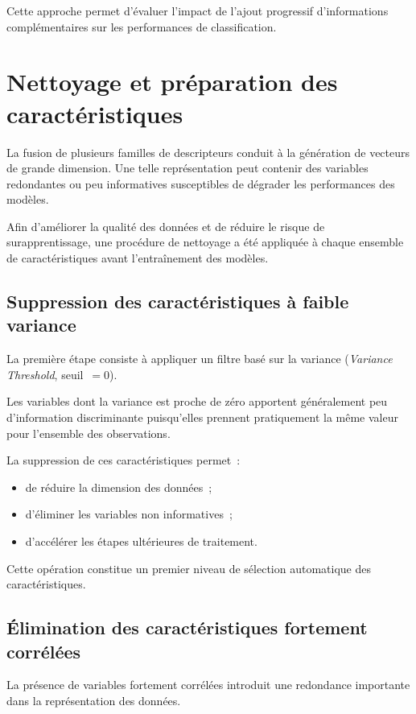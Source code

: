 Cette approche permet d'évaluer l'impact de l'ajout progressif d'informations complémentaires
sur les performances de classification.

\section{Nettoyage et préparation des caractéristiques}

La fusion de plusieurs familles de descripteurs conduit à la génération de vecteurs de grande
dimension. Une telle représentation peut contenir des variables redondantes ou peu
informatives susceptibles de dégrader les performances des modèles.

Afin d'améliorer la qualité des données et de réduire le risque de surapprentissage, une
procédure de nettoyage a été appliquée à chaque ensemble de caractéristiques avant
l'entraînement des modèles.

\subsection{Suppression des caractéristiques à faible variance}

La première étape consiste à appliquer un filtre basé sur la variance
(\emph{Variance Threshold}, seuil~$=0$).

Les variables dont la variance est proche de zéro apportent généralement peu d'information
discriminante puisqu'elles prennent pratiquement la même valeur pour l'ensemble des
observations.

La suppression de ces caractéristiques permet~:
\begin{itemize}[leftmargin=1.4em,itemsep=2pt]
  \item de réduire la dimension des données~;
  \item d'éliminer les variables non informatives~;
  \item d'accélérer les étapes ultérieures de traitement.
\end{itemize}

Cette opération constitue un premier niveau de sélection automatique des caractéristiques.

\subsection{Élimination des caractéristiques fortement corrélées}

La présence de variables fortement corrélées introduit une redondance importante dans la
représentation des données.

